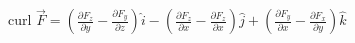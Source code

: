 \documentclass[preview]{standalone}
\begin{document}
\begin{center}
curl $\vec{F} = (\frac{\partial F_{z}}{\partial y} - \frac{\partial F_{y}}{\partial z}) \hat{i} - (\frac{\partial F_{z}}{\partial x} - \frac{\partial F_{z}}{\partial x}) \hat{j} + (\frac{\partial F_{y}}{\partial x} - \frac{\partial F_{x}}{\partial y}) \hat{k}$
\end{center}
\end{document}
